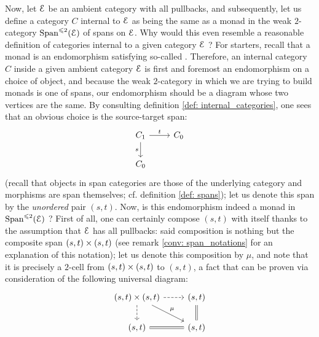 \begin{remark}
                Now, let $\E$ be an ambient category with all pullbacks, and subsequently, let us define a category $C$ internal to $\E$ as being the same as a monad in the weak $2$-category $\Span^{\leq 2}(\E)$ of spans on $\E$. Why would this even resemble a reasonable definition of categories internal to a given category $\E$ ? For starters, recall that a monad is an endomorphism satisfying so-called . Therefore, an internal category $C$ inside a given ambient category $\E$ is first and foremost an endomorphism on a choice of object, and because the weak $2$-category in which we are trying to build monads is one of spans, our endomorphism should be a  diagram whose two  vertices are the same. By consulting definition \ref{def: internal_categories}, one sees that an obvious choice is the source-target span:
                    $$
                        \begin{tikzcd}
                        	{C_1} & {C_0} \\
                        	{C_0}
                        	\arrow["s"', from=1-1, to=2-1]
                        	\arrow["t", from=1-1, to=1-2]
                        \end{tikzcd}
                    $$
                (recall that objects in span categories are those of the underlying category and morphisms are span themselves; cf. definition \ref{def: spans}); let us denote this span by the \textit{unordered} pair $(s, t)$. Now, is this endomorphism indeed a monad in $\Span^{\leq 2}(\E)$ ? First of all, one can certainly compose $(s, t)$ with itself thanks to the assumption that $\E$ has all pullbacks: said composition is nothing but the composite span $(s, t) \x (s, t)$ (see remark \ref{conv: span_notations} for an explanation of this notation); let us denote this composition by $\mu$, and note that it is precisely a $2$-cell from $(s, t) \x (s, t)$ to $(s, t)$, a fact that can be proven via consideration of the following universal diagram:
                    $$
                        \begin{tikzcd}
                        	{(s, t) \x (s, t)} & {(s, t)} \\
                        	{(s, t)} & {(s, t)}
                        	\arrow[dashed, from=1-1, to=2-1]
                        	\arrow[dashed, from=1-1, to=1-2]
                        	\arrow[Rightarrow, no head, from=1-2, to=2-2]
                        	\arrow[Rightarrow, no head, from=2-1, to=2-2]
                        	\arrow["\mu", from=1-1, to=2-2]

\end{tikzcd}$$
\end{remark}
